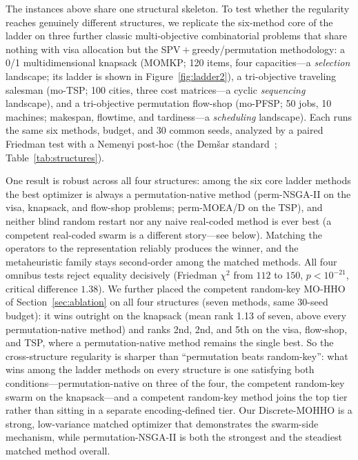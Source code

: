 \documentclass[runningheads]{llncs}
\begin{document}
The instances above share one structural skeleton. To test whether the regularity reaches genuinely different structures, we replicate the six-method core of the ladder on three further classic multi-objective combinatorial problems that share nothing with visa allocation but the SPV${}+{}$greedy/permutation methodology: a 0/1 multidimensional knapsack (MOMKP; 120 items, four capacities---a \emph{selection} landscape; its ladder is shown in Figure~\ref{fig:ladder2}), a tri-objective traveling salesman (mo-TSP; 100 cities, three cost matrices---a cyclic \emph{sequencing} landscape), and a tri-objective permutation flow-shop (mo-PFSP; 50 jobs, 10 machines; makespan, flowtime, and tardiness---a \emph{scheduling} landscape). Each runs the same six methods, budget, and 30 common seeds, analyzed by a paired Friedman test with a Nemenyi post-hoc (the Demšar standard~\cite{demsar}; Table~\ref{tab:structures}).

One result is robust across all four structures: among the six core ladder methods the best optimizer is always a permutation-native method (perm-NSGA-II on the visa, knapsack, and flow-shop problems; perm-MOEA/D on the TSP), and neither blind random restart nor any naive real-coded method is ever best (a competent real-coded swarm is a different story---see below). Matching the operators to the representation reliably produces the winner, and the metaheuristic family stays second-order among the matched methods. All four omnibus tests reject equality decisively (Friedman $\chi^2$ from $112$ to $150$, $p<10^{-21}$, critical difference $1.38$). We further placed the competent random-key MO-HHO of Section~\ref{sec:ablation} on all four structures (seven methods, same 30-seed budget): it wins outright on the knapsack (mean rank 1.13 of seven, above every permutation-native method) and ranks 2nd, 2nd, and 5th on the visa, flow-shop, and TSP, where a permutation-native method remains the single best. So the cross-structure regularity is sharper than ``permutation beats random-key'': what wins among the ladder methods on every structure is one satisfying both conditions---permutation-native on three of the four, the competent random-key swarm on the knapsack---and a competent random-key method joins the top tier rather than sitting in a separate encoding-defined tier. Our Discrete-MOHHO is a strong, low-variance matched optimizer that demonstrates the swarm-side mechanism, while permutation-NSGA-II is both the strongest and the steadiest matched method overall.
\end{document}
